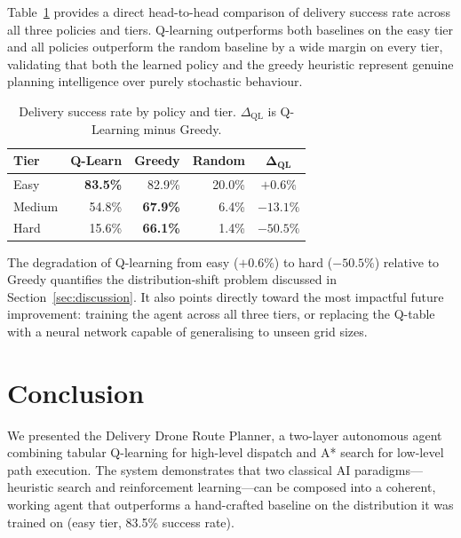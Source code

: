 \documentclass[11pt,twocolumn]{article}
\begin{document}
Table~\ref{tab:baselines} provides a direct head-to-head comparison of
delivery success rate across all three policies and tiers.
Q-learning outperforms both baselines on the easy tier and all policies
outperform the random baseline by a wide margin on every tier,
validating that both the learned policy and the greedy heuristic
represent genuine planning intelligence over purely stochastic behaviour.

\begin{table}[H]
\centering
\small
\caption{Delivery success rate by policy and tier. $\Delta_{\text{QL}}$
is Q-Learning minus Greedy.}
\label{tab:baselines}
\begin{tabular}{lrrrc}
\toprule
\textbf{Tier} & \textbf{Q-Learn} & \textbf{Greedy} & \textbf{Random}
    & $\boldsymbol{\Delta_{\text{QL}}}$ \\
\midrule
Easy   & \textbf{83.5\%} & 82.9\% & 20.0\% & $+0.6\%$ \\
Medium & 54.8\%          & \textbf{67.9\%} & 6.4\%  & $-13.1\%$ \\
Hard   & 15.6\%          & \textbf{66.1\%} & 1.4\%  & $-50.5\%$ \\
\bottomrule
\end{tabular}
\end{table}

The degradation of Q-learning from easy ($+0.6\%$) to hard ($-50.5\%$)
relative to Greedy quantifies the distribution-shift problem discussed
in Section~\ref{sec:discussion}.
It also points directly toward the most impactful future improvement:
training the agent across all three tiers, or replacing the Q-table
with a neural network capable of generalising to unseen grid sizes.

\section{Conclusion}
\label{sec:conclusion}

We presented the Delivery Drone Route Planner, a two-layer autonomous
agent combining tabular Q-learning for high-level dispatch and A* search
for low-level path execution.
The system demonstrates that two classical AI paradigms---heuristic
search and reinforcement learning---can be composed into a coherent,
working agent that outperforms a hand-crafted baseline on the
distribution it was trained on (easy tier, 83.5\% success rate).
\end{document}
